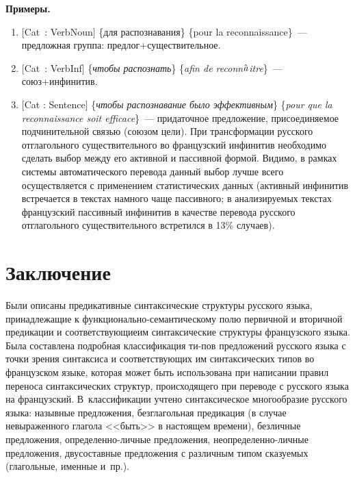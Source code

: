 \begin{multicols}{2}
     \noindent
     \textbf{Примеры.}
     \begin{enumerate}
     \item $[$Cat~: VerbNoun$]$ \{для распознавания\} \{pour la reconnaissance\}~--- 
предложная группа: предлог\;+\;существительное.
     \item  $[$Cat~: VerbInf$]$ \{\textit{чтобы распознать}\} \{\textit{afin de 
reconn$\hat{\mbox{\textit{a}}}$itre}\}~--- союз\;+\;инфинитив.
     \item $[$Cat : Sentence$]$ \{\textit{чтобы распознавание было 
эффективным}\} \{\textit{pour que la reconnaissance soit\linebreak
efficace}\}~--- 
придаточное предложение, присоединяемое подчинительной связью (союзом\linebreak 
цели). При трансформации русского отглагольного существительного во 
французский инфинитив необходимо сделать выбор между его активной и 
пассивной формой. Видимо, в рамках сис\-те\-мы автоматического перевода 
данный выбор лучше всего осуществляется с применением статистических 
данных (активный инфинитив встречается в текстах намного чаще 
пассивного; в анализируемых текстах французский пассивный инфинитив в 
качестве перевода русского отглагольного существительного встретился в 
13\% случаев).
     \end{enumerate}
     
\section{Заключение}
     
     Были описаны предикативные синтаксические структуры русского 
языка, принадлежащие к функционально-семантическому полю первичной и 
вторичной предикации и соответствующие\linebreak им синтаксические структуры 
французского языка. Была составлена подробная классификация ти-\linebreak пов 
предложений русского языка с точки зрения синтаксиса и соответствующих 
им синтаксических типов во французском языке, которая может быть 
использована при написании правил переноса синтаксических структур, 
происходящего при переводе с русского языка на французский. 
В~классификации учтено синтаксическое многообразие русского языка: 
назывные предложения, безглагольная предикация (в случае невыраженного 
глагола <<быть>> в настоящем времени), безличные предложения, 
     опре\-де\-лен\-но-лич\-ные предложения, не\-опре\-де\-лен\-но-лич\-ные 
предложения, двусоставные предложения с различным типом ска\-зу\-емых 
(глагольные, именные и~пр.). 
     

\end{multicols}
